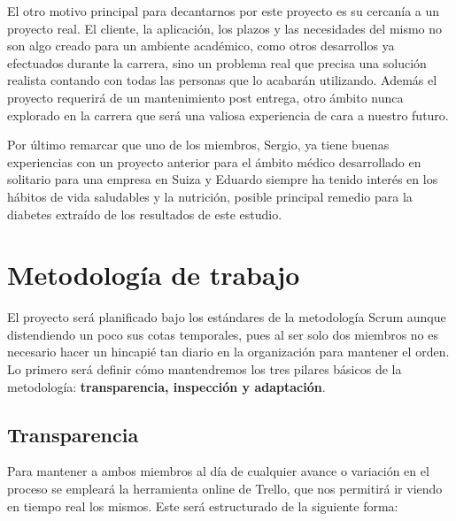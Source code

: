 	El otro motivo principal para decantarnos por este proyecto es su cercanía a un proyecto real. El cliente, la aplicación, los plazos y las necesidades del mismo no son algo creado para un ambiente académico, como otros desarrollos ya efectuados durante la carrera, sino un problema real que precisa una solución realista contando con todas las personas que lo acabarán utilizando. Además el proyecto requerirá de un mantenimiento post entrega, otro ámbito nunca explorado en la carrera que será una valiosa experiencia de cara a nuestro futuro.\newline

	Por último remarcar que uno de los miembros, Sergio, ya tiene buenas experiencias con un proyecto anterior para el ámbito médico desarrollado en solitario para una empresa en Suiza y Eduardo siempre ha tenido interés en los hábitos de vida saludables y la nutrición, posible principal remedio para la diabetes extraído de los resultados de este estudio.\newpage
	
	\section{Metodología de trabajo}
    
    El proyecto será planificado bajo los estándares de la metodología Scrum aunque distendiendo un poco sus cotas temporales, pues al ser solo dos miembros no es necesario hacer un hincapié tan diario en la organización para mantener el orden. Lo primero será definir cómo mantendremos los tres pilares básicos de la metodología: \textbf{transparencia, inspección y adaptación}.
    
    \subsection{Transparencia}
    Para mantener a ambos miembros al día de cualquier avance o variación en el proceso se empleará la herramienta online de Trello, que nos permitirá ir viendo en tiempo real los mismos. Este será estructurado de la siguiente forma:
    
